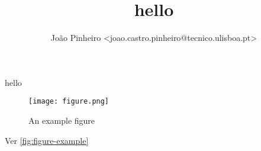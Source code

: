 \documentclass[portuguese, a4paper, titlepage]{article}
\title{hello}
\author{João Pinheiro <joao.castro.pinheiro@tecnico.ulisboa.pt>}
\begin{document}
	\hypersetup{pageanchor=false}
	\maketitle
	\hypersetup{pageanchor=true}
	hello

	\begin{figure}[h]
		\centering
		\texttt{[image: figure.png]}
		\caption{An example figure}
		\label{fig:figure-example}
	\end{figure}

	Ver \autoref{fig:figure-example}
\end{document}
